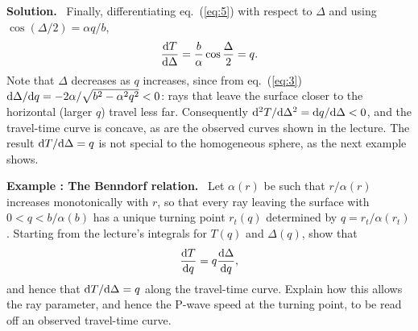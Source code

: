 \documentclass[a4paper,12pt]{paper}
\newcounter{example}
\renewenvironment{example}[1]{%
  \refstepcounter{example}%
  \begin{mdframed}[linewidth=1pt,innertopmargin=6pt,innerbottommargin=6pt]%
  \noindent\textbf{Example \theexample: #1.}\ }{%
  \end{mdframed}}
\newenvironment{solution}{\par\noindent\textbf{Solution.}\ }{\par\medskip}
\begin{document}
\begin{solution}
Finally, differentiating eq.~(\ref{eq:5}) with respect to $\Delta$ and using
$\cos(\Delta/2)=\alpha q/b$,
\begin{equation}
\frac{\mathrm{d} T}{\mathrm{d}\Delta}=\frac{b}{\alpha}\cos\frac{\Delta}{2}=q.
\label{eq:6}
\end{equation}
Note that $\Delta$ decreases as $q$ increases, since from eq.~(\ref{eq:3})
$\mathrm{d}\Delta/\mathrm{d} q=-2\alpha/\sqrt{b^{2}-\alpha^{2}q^{2}}<0$: rays that leave the surface
closer to the horizontal (larger $q$) travel less far. Consequently
$\mathrm{d}^{2}T/\mathrm{d}\Delta^{2}=\mathrm{d} q/\mathrm{d}\Delta<0$, and the travel-time curve is concave, as
are the observed curves shown in the lecture. The result $\mathrm{d} T/\mathrm{d}\Delta=q$ is not special
to the homogeneous sphere, as the next example shows.
\end{solution}

\begin{example}{The Benndorf relation}
Let $\alpha(r)$ be such that $r/\alpha(r)$ increases monotonically with $r$, so that every ray
leaving the surface with $0<q<b/\alpha(b)$ has a unique turning point $r_{t}(q)$ determined by
$q=r_{t}/\alpha(r_{t})$. Starting from the lecture's integrals for $T(q)$ and $\Delta(q)$, show
that
\begin{equation*}
\frac{\mathrm{d} T}{\mathrm{d} q}=q\frac{\mathrm{d}\Delta}{\mathrm{d} q},
\end{equation*}
and hence that $\mathrm{d} T/\mathrm{d}\Delta=q$ along the travel-time curve. Explain how this allows the
ray parameter, and hence the P-wave speed at the turning point, to be read off an observed
travel-time curve.
\end{example}
\end{document}
